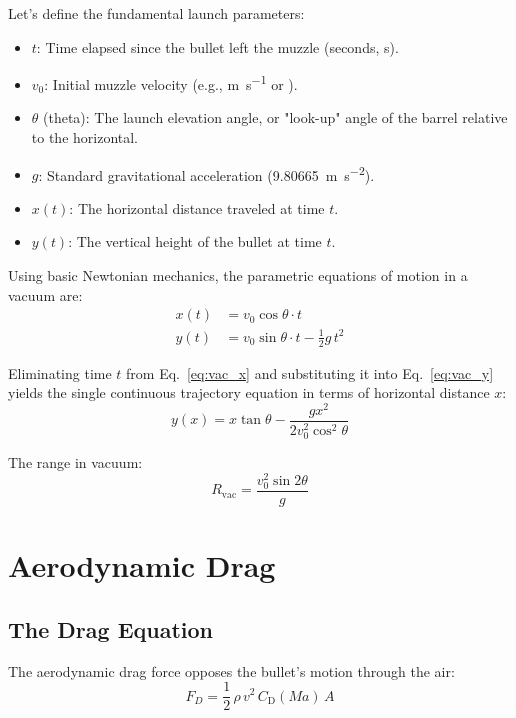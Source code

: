\documentclass[11pt,twoside,openright]{report}
\newcommand{\Cd}{C_{\mathrm{D}}}
\newcommand{\Mach}{\mathit{Ma}}
\begin{document}
Let's define the fundamental launch parameters:
\begin{itemize}[noitemsep]
    \item $t$: Time elapsed since the bullet left the muzzle (seconds, \si{\second}).
    \item $v_0$: Initial muzzle velocity (e.g., \si{\meter\per\second} or \si{\fps}).
    \item $\theta$ (theta): The launch elevation angle, or "look-up" angle of the barrel relative to the horizontal.
    \item $g$: Standard gravitational acceleration (\SI{9.80665}{\meter\per\second\squared}).
    \item $x(t)$: The horizontal distance traveled at time $t$.
    \item $y(t)$: The vertical height of the bullet at time $t$.
\end{itemize}

Using basic Newtonian mechanics, the parametric equations of motion in a vacuum are:
\begin{align}
  x(t) &= v_0 \cos\theta \cdot t \label{eq:vac_x}\\
  y(t) &= v_0 \sin\theta \cdot t - \frac{1}{2}g\,t^2 \label{eq:vac_y}
\end{align}

Eliminating time $t$ from Eq.~\eqref{eq:vac_x} and substituting it into Eq.~\eqref{eq:vac_y} yields the single continuous trajectory equation in terms of horizontal distance $x$:
\begin{equation}
  \boxed{y(x) = x \tan\theta - \frac{g x^2}{2 v_0^2 \cos^2\theta}}
  \label{eq:vac_y_x}
\end{equation}

The range in vacuum:
\begin{equation}
  R_{\mathrm{vac}} = \frac{v_0^2 \sin 2\theta}{g}
  \label{eq:vac_range}
\end{equation}

\section{Aerodynamic Drag}

\subsection{The Drag Equation}

The aerodynamic drag force opposes the bullet's motion through the air:
\begin{equation}
  \boxed{F_D = \frac{1}{2}\,\rho\,v^2\,\Cd(\Mach)\,A}
  \label{eq:drag_force}
\end{equation}
\end{document}
